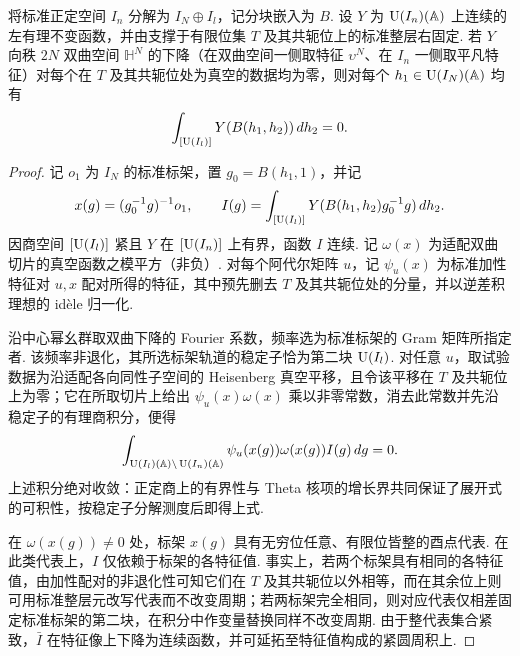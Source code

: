 \begin{lemma}[双曲下降消失蕴含分块周期消失]
\label{lem:c-false-fourier-block-period}
\emitthmsource
将标准正定空间 $I_n$ 分解为 $I_N\oplus I_l$，记分块嵌入为 $B$. 设 $Y$ 为 $\operatorname{U}(I_n)(\mathbb A)$ 上连续的左有理不变函数，并由支撑于有限位集 $T$ 及其共轭位上的标准整层右固定. 若 $Y$ 向秩 $2N$ 双曲空间 $\mathbb H^N$ 的下降（在双曲空间一侧取特征 $\upsilon^N$、在 $I_n$ 一侧取平凡特征）对每个在 $T$ 及其共轭位处为真空的数据均为零，则对每个 $h_1\in \operatorname{U}(I_N)(\mathbb A)$ 均有
\[
       \int_{[\operatorname{U}(I_l)]}Y(B(h_1,h_2))\,dh_2=0 .
\]
\end{lemma}

\begin{proof}
记 $o_1$ 为 $I_N$ 的标准标架，置 $g_0=B(h_1,1)$，并记
\[
 x(g)=(g_0^{-1}g)^{-1}o_1,\qquad
 I(g)=\int_{[\operatorname{U}(I_l)]}Y(B(h_1,h_2)g_0^{-1}g)\,dh_2 .
\]
因商空间 $[\operatorname{U}(I_l)]$ 紧且 $Y$ 在 $[\operatorname{U}(I_n)]$ 上有界，函数 $I$ 连续. 记 $\omega(x)$ 为适配双曲切片的真空函数之模平方（非负）. 对每个阿代尔矩阵 $u$，记 $\psi_u(x)$ 为标准加性特征对 $u,x$ 配对所得的特征，其中预先删去 $T$ 及其共轭位处的分量，并以逆差积理想的 idèle 归一化.

沿中心幂幺群取双曲下降的 Fourier 系数，频率选为标准标架的 Gram 矩阵所指定者. 该频率非退化，其所选标架轨道的稳定子恰为第二块 $\operatorname{U}(I_l)$. 对任意 $u$，取试验数据为沿适配各向同性子空间的 Heisenberg 真空平移，且令该平移在 $T$ 及共轭位上为零；它在所取切片上给出 $\psi_u(x)\omega(x)$ 乘以非零常数，消去此常数并先沿稳定子的有理商积分，便得
\[
 \int_{\operatorname{U}(I_l)(\mathbb A)\backslash \operatorname{U}(I_n)(\mathbb A)}
           \psi_u(x(g))\omega(x(g))I(g)\,dg=0 .
\]
上述积分绝对收敛：正定商上的有界性与 Theta 核项的增长界共同保证了展开式的可积性，按稳定子分解测度后即得上式.

在 $\omega(x(g))\ne0$ 处，标架 $x(g)$ 具有无穷位任意、有限位皆整的酉点代表. 在此类代表上，$I$ 仅依赖于标架的各特征值. 事实上，若两个标架具有相同的各特征值，由加性配对的非退化性可知它们在 $T$ 及其共轭位以外相等，而在其余位上则可用标准整层元改写代表而不改变周期；若两标架完全相同，则对应代表仅相差固定标准标架的第二块，在积分中作变量替换同样不改变周期. 由于整代表集合紧致，$\bar I$ 在特征像上下降为连续函数，并可延拓至特征值构成的紧圆周积上.


\end{proof}
